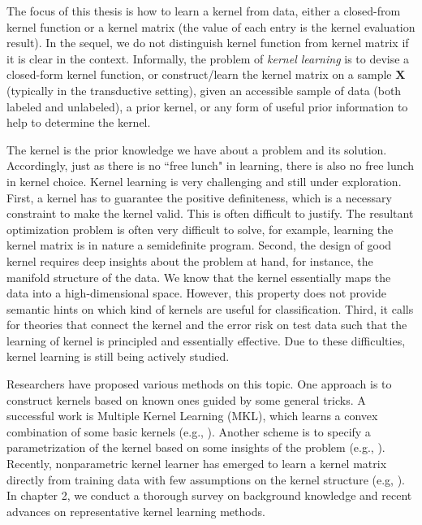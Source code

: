 The focus of this thesis is how to learn a kernel from data, either a closed-from kernel function or a kernel matrix (the value of each entry is the kernel evaluation result). In the sequel, we do not distinguish kernel function from kernel matrix if it is clear in the context. Informally, the problem of {\em kernel learning} is to devise a closed-form kernel function, or construct/learn the kernel matrix on a sample $\mathbf X$ (typically in the transductive setting), given an accessible sample of data (both labeled and unlabeled), a prior kernel, or any form of useful prior information to help to determine the kernel.

The kernel is the prior knowledge we have about a problem and its solution. Accordingly, just as there is no ``free lunch" in learning, there is also no free lunch in kernel choice. Kernel learning is very challenging and still under exploration. First, a kernel has to guarantee the positive definiteness, which is a necessary constraint to make the kernel valid. This is often difficult to justify. The resultant optimization problem is often very difficult to solve, for example, learning the kernel matrix is in nature a semidefinite program\cite{Boyd}. Second, the design of good kernel requires deep insights about the problem at hand, for instance, the manifold structure of the data. We know that the kernel essentially maps the data into a high-dimensional space. However, this property does not provide semantic hints on which kind of kernels are useful for classification. Third, it calls for theories that connect the kernel and the error risk on test data such that the learning of kernel is principled and essentially effective. Due to these difficulties, kernel learning is still being actively studied.

Researchers have proposed various methods on this topic. One approach is to construct kernels based on known ones guided by some general tricks. A successful work is Multiple Kernel Learning (MKL), which learns a convex combination of some basic kernels (e.g., \cite{jmlr/LanckrietCBGJ03}). Another scheme is to specify a parametrization of the kernel based on some insights of the problem (e.g., \cite{icml/KondorL02}). Recently, nonparametric kernel learner has emerged to learn a kernel matrix directly from training data with few assumptions on the kernel structure (e.g, \cite{jmlr/TsudaRW05}\cite{icml/KulisSD06}\cite{icml/HoiJL07}\cite{icml/LiYW07}). In chapter 2, we conduct a thorough survey on background knowledge and recent advances on representative kernel learning methods.

